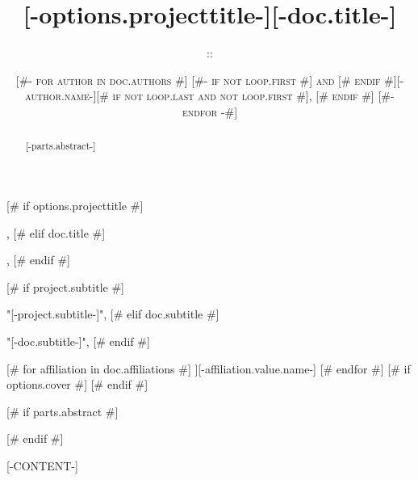 \documentclass{tudelft-report}
\begin{document}
\frontmatter



[# if options.projecttitle #]
  \title{[-options.projecttitle-]},
[# elif doc.title #]
  \title{[-doc.title-]},
[# endif #]


[# if project.subtitle #]
  \subtitle: "[-project.subtitle-]",
[# elif doc.subtitle #]
  \subtitle: "[-doc.subtitle-]",
[# endif #]


\author{\textsc{
[#- for author in doc.authors #]
  [#- if not loop.first #] and [# endif #][-author.name-][# if not loop.last and not loop.first #], [# endif #]
[#- endfor -#]
}}



[# for affiliation in doc.affiliations #]
\affil[[-affiliation.index-]]{[-affiliation.value.name-]}
[# endfor #]
[# if options.cover #]
[# endif #]

\makecover

% 
% 
[# if parts.abstract #]
\begin{abstract}
[-parts.abstract-]
\end{abstract}
[# endif #]

\tableofcontents

% 


\mainmatter


[-CONTENT-]



\end{document}

